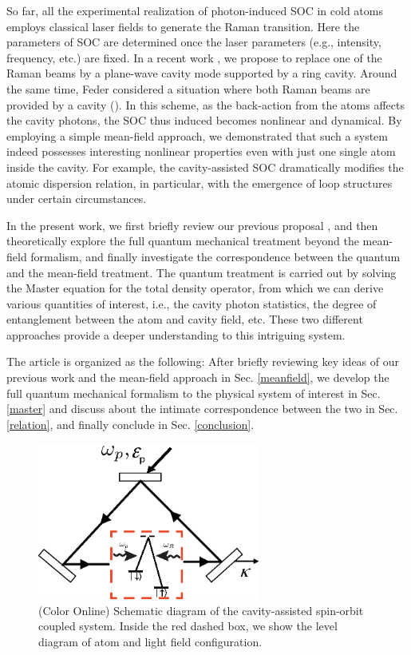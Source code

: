 \documentclass[atoms,article,submit,moreauthors,pdftex,12pt,a4paper]{mdpi}
\begin{document}
So far, all the experimental realization of photon-induced SOC in cold atoms employs classical laser fields to generate the Raman transition. Here the parameters of SOC are determined once the laser parameters (e.g., intensity, frequency, etc.) are fixed. In a recent work \cite{cavitySOC}, we propose to replace one of the Raman beams by a plane-wave cavity mode supported by a ring cavity. Around the same time, Feder considered a situation where both Raman beams are provided by a cavity (\cite{Feder}). In this scheme, as the back-action from the atoms affects the cavity photons, the SOC thus induced becomes nonlinear and dynamical. By employing a simple mean-field approach, we demonstrated \cite{cavitySOC} that such a system indeed possesses interesting nonlinear properties even with just one single atom inside the cavity. For example, the cavity-assisted SOC dramatically modifies the atomic dispersion relation, in particular, with the emergence of loop structures under certain circumstances.
  
In the present work, we first briefly review our previous proposal \cite{cavitySOC}, and then theoretically explore the full quantum mechanical treatment beyond the mean-field formalism, and finally investigate the correspondence between the quantum and the mean-field treatment. The quantum treatment is carried out by solving the Master equation for the total density operator, from which we can derive various quantities of interest, i.e., the cavity photon statistics, the degree of entanglement between the atom and cavity field, etc. These two different approaches provide a deeper understanding to this intriguing system. 

The article is organized as the following: After briefly reviewing key ideas of our previous work and the mean-field approach in Sec. \ref{meanfield}, we develop the full quantum mechanical formalism to the physical system of interest in Sec. \ref{master} and discuss about the intimate correspondence between the two in Sec. \ref{relation}, and finally conclude in Sec. \ref{conclusion}. 

\begin{figure}[htp]
\includegraphics[width=0.65\textwidth]{schematic}\caption{(Color Online) Schematic diagram of the cavity-assisted spin-orbit coupled system. Inside the red dashed box, we show the level diagram of atom and light field configuration. }\label{schematic}
\end{figure}
\end{document}
